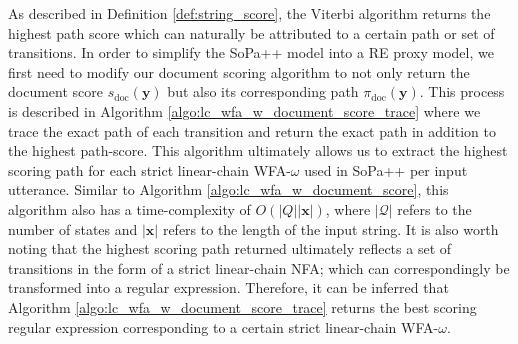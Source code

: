 As described in Definition \ref{def:string_score}, the Viterbi algorithm returns
the highest path score which can naturally be attributed to a certain path or
set of transitions. In order to simplify the SoPa++ model into a RE proxy model,
we first need to modify our document scoring algorithm to not only return the
document score $s_{\text{doc}}(\bm{y})$ but also its corresponding path
$\pi_{\text{doc}}(\bm{y})$. This process is described in Algorithm
\ref{algo:lc_wfa_w_document_score_trace} where we trace the exact path of each
transition and return the exact path in addition to the highest path-score. This
algorithm ultimately allows us to extract the highest scoring path for each
strict linear-chain WFA-$\omega$ used in SoPa++ per input utterance. Similar to
Algorithm \ref{algo:lc_wfa_w_document_score}, this algorithm also has a
time-complexity of $O(|Q||\bm{x}|)$, where $|\mathcal{Q}|$ refers to the number
of states and $|\bm{x}|$ refers to the length of the input string. It is also
worth noting that the highest scoring path returned ultimately reflects a set of
transitions in the form of a strict linear-chain NFA; which can correspondingly
be transformed into a regular expression. Therefore, it can be inferred that
Algorithm \ref{algo:lc_wfa_w_document_score_trace} returns the best scoring
regular expression corresponding to a certain strict linear-chain WFA-$\omega$.

\subsection{}


